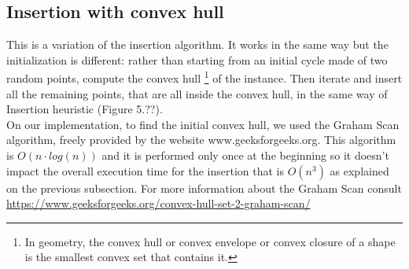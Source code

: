 \subsection{Insertion with convex hull}
This is a variation of the insertion algorithm. It works in the same way but the initialization is different: rather than starting from an initial cycle made of two random points, compute the convex hull \footnote{In geometry, the convex hull or convex envelope or convex closure of a shape is the smallest convex set that contains it. %
} of the instance. Then iterate and insert all the remaining points, that are all inside the convex hull, in the same way of Insertion heuristic (Figure 5.??).\\
On our implementation, to find the initial convex hull, we used the Graham Scan algorithm, freely provided by the website www.geeksforgeeks.org. This algorithm is $O(n \cdot log(n))$ and it is performed only once at the beginning so it doesn't impact the overall execution time for the insertion that is $O(n^3)$ as explained on the previous subsection. For more information about the Graham Scan consult \url{https://www.geeksforgeeks.org/convex-hull-set-2-graham-scan/}

